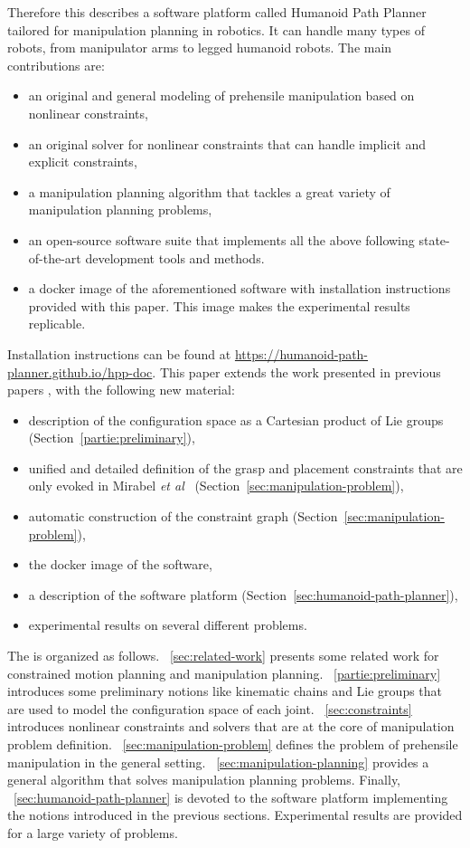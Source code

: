 Therefore this \paper describes a software platform called {Humanoid Path
  Planner} tailored for manipulation planning in robotics. It can handle many types of robots, from manipulator arms to legged humanoid robots.
The main contributions are:
\begin{itemize}
\item an original and general modeling of prehensile manipulation based on
  nonlinear constraints,
\item an original solver for nonlinear constraints that can handle implicit and explicit constraints,
\item a manipulation planning algorithm that tackles a great variety of manipulation planning problems,
\item an open-source software suite that implements all the above following state-of-the-art development tools and methods.
\item a docker image of the aforementioned software with installation instructions provided with this paper. This image makes the experimental results replicable.
\end{itemize}
{\color{blue} Installation instructions can be found at \href{https://humanoid-path-planner.github.io/hpp-doc}{https://humanoid-path-planner.github.io/hpp-doc}.}
This paper extends the work presented in {\color{blue} previous papers }\cite{mirabel-iros2016},\cite{MirLam2018} with the following new material:
\begin{itemize}
\item description of the configuration space as a Cartesian product of Lie groups (Section~\ref{partie:preliminary}),
\item unified and detailed definition of the grasp and placement constraints that are only evoked in {\color{blue}Mirabel \textit{et al}}~\cite{mirabel-iros2016} (Section~\ref{sec:manipulation-problem}),
\item automatic construction of the constraint graph (Section~\ref{sec:manipulation-problem}),
\item the docker image of the software,
\item a description of the software platform (Section~\ref{sec:humanoid-path-planner}),
\item experimental results on several different problems.
\end{itemize}

The \paper is organized as follows. \Partie~\ref{sec:related-work} presents some related work for constrained motion planning and manipulation planning.
\Partie~\ref{partie:preliminary} introduces some preliminary notions like kinematic chains and Lie groups that are used to model the configuration space of each joint. \Partie~\ref{sec:constraints} introduces nonlinear constraints and solvers that are at the core of manipulation problem definition. \Partie~\ref{sec:manipulation-problem} defines the problem of prehensile manipulation in the general setting. \Partie~\ref{sec:manipulation-planning} provides a general algorithm that solves manipulation planning problems. Finally, \partie~\ref{sec:humanoid-path-planner} is devoted to the software platform implementing the notions introduced in the previous sections. Experimental results are provided for a large variety of problems.

